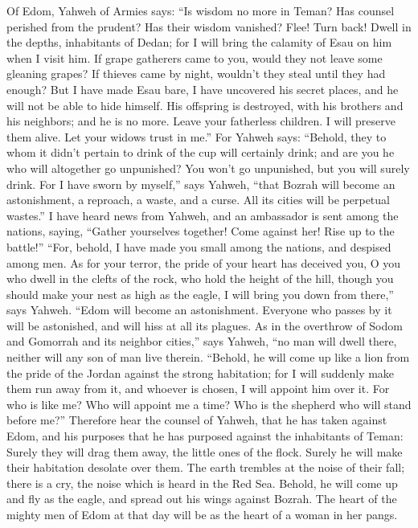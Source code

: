 Of Edom, Yahweh of Armies says: ``Is wisdom no more in
Teman? Has counsel perished from the prudent? Has their wisdom vanished?
 Flee! Turn back! Dwell in the depths, inhabitants of
Dedan; for I will bring the calamity of Esau on him when I visit him.
 If grape gatherers came to you, would they not leave some
gleaning grapes? If thieves came by night, wouldn't they steal until
they had enough?  But I have made Esau bare, I have
uncovered his secret places, and he will not be able to hide himself.
His offspring is destroyed, with his brothers and his neighbors; and he
is no more.  Leave your fatherless children. I will
preserve them alive. Let your widows trust in me.''  For
Yahweh says: ``Behold, they to whom it didn't pertain to drink of the
cup will certainly drink; and are you he who will altogether go
unpunished? You won't go unpunished, but you will surely drink.
 For I have sworn by myself,'' says Yahweh, ``that Bozrah
will become an astonishment, a reproach, a waste, and a curse. All its
cities will be perpetual wastes.''  I have heard news
from Yahweh, and an ambassador is sent among the nations, saying,
``Gather yourselves together! Come against her! Rise up to the battle!''
 ``For, behold, I have made you small among the nations,
and despised among men.  As for your terror, the pride of
your heart has deceived you, O you who dwell in the clefts of the rock,
who hold the height of the hill, though you should make your nest as
high as the eagle, I will bring you down from there,'' says Yahweh.
 ``Edom will become an astonishment. Everyone who passes
by it will be astonished, and will hiss at all its plagues.
 As in the overthrow of Sodom and Gomorrah and its
neighbor cities,'' says Yahweh, ``no man will dwell there, neither will
any son of man live therein.  ``Behold, he will come up
like a lion from the pride of the Jordan against the strong habitation;
for I will suddenly make them run away from it, and whoever is chosen, I
will appoint him over it. For who is like me? Who will appoint me a
time? Who is the shepherd who will stand before me?'' 
Therefore hear the counsel of Yahweh, that he has taken against Edom,
and his purposes that he has purposed against the inhabitants of Teman:
Surely they will drag them away, the little ones of the flock. Surely he
will make their habitation desolate over them.  The earth
trembles at the noise of their fall; there is a cry, the noise which is
heard in the Red Sea.  Behold, he will come up and fly as
the eagle, and spread out his wings against Bozrah. The heart of the
mighty men of Edom at that day will be as the heart of a woman in her
pangs.

